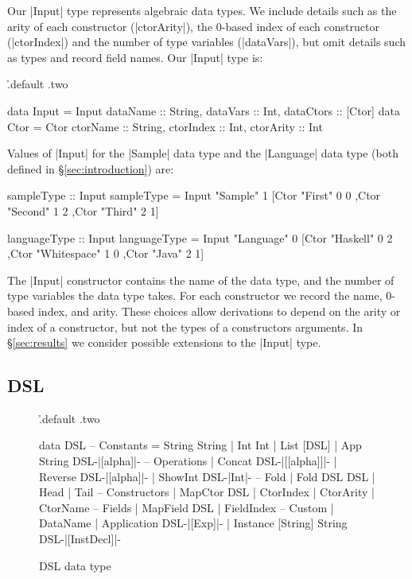 \documentclass{llncs}
\begin{document}
Our |Input| type represents algebraic data types. We include details such as the arity of each constructor (|ctorArity|), the 0-based index of each constructor (|ctorIndex|) and the number of type variables (|dataVars|), but omit details such as types and record field names. Our |Input| type is:

\h{.default .two}\begin{code}
data Input  = Input {dataName :: String, dataVars :: Int, dataCtors :: [Ctor]}
data Ctor   = Ctor {ctorName :: String, ctorIndex :: Int, ctorArity :: Int}
\end{code}

\noindent Values of |Input| for the |Sample| data type and the |Language| data type (both defined in \S\ref{sec:introduction}) are:

\begin{code}
sampleType :: Input
sampleType = Input "Sample" 1
    [Ctor "First"   0 0
    ,Ctor "Second"  1 2
    ,Ctor "Third"   2 1]

languageType :: Input
languageType = Input "Language" 0
    [Ctor "Haskell"     0 2
    ,Ctor "Whitespace"  1 0
    ,Ctor "Java"        2 1]
\end{code}

The |Input| constructor contains the name of the data type, and the number of type variables the data type takes. For each constructor we record the name, 0-based index, and arity. These choices allow derivations to depend on the arity or index of a constructor, but not the types of a constructors arguments. In \S\ref{sec:results} we consider possible extensions to the |Input| type.

\subsection{DSL}

\begin{figure}
\h{.default .two}\begin{code}
data DSL
       -- Constants
    =  String String
    |  Int Int
    |  List [DSL]
    |  App String DSL{-|[alpha]|-}
       -- Operations
    |  Concat DSL{-|[[alpha]]|-}
    |  Reverse DSL{-|[alpha]|-}
    |  ShowInt DSL{-|Int|-}
       -- Fold
    |  Fold DSL DSL
    |  Head
    |  Tail
       -- Constructors
    |  MapCtor DSL
    |  CtorIndex
    |  CtorArity
    |  CtorName
       -- Fields
    |  MapField DSL
    |  FieldIndex
       -- Custom
    |  DataName
    |  Application DSL{-|[Exp]|-}
    |  Instance [String] String DSL{-|[InstDecl]|-}
\end{code}
\caption{DSL data type}
\label{fig:dsl}
\end{figure}
\end{document}
